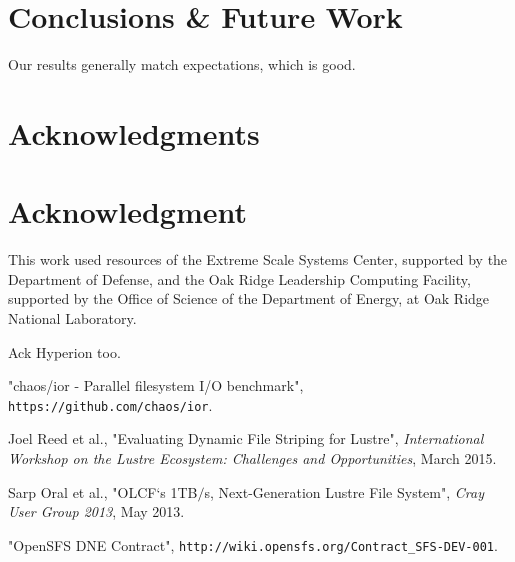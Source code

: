 \documentclass[conference,compsoc]{IEEEtran}
\begin{document}
\section{Conclusions \& Future Work}

Our results generally match expectations, which is good.


\ifCLASSOPTIONcompsoc
  \section*{Acknowledgments}
\else
  \section*{Acknowledgment}
\fi

This work used resources of the Extreme Scale Systems Center, supported
by the Department of Defense, and the Oak Ridge Leadership Computing
Facility, supported by the Office of Science of the Department of
Energy, at Oak Ridge National Laboratory.

Ack Hyperion too.



%
%
%
\begin{thebibliography}{1}


"chaos/ior - Parallel filesystem I/O benchmark", \texttt{https://github.com/chaos/ior}.

Joel Reed et al., "Evaluating Dynamic File Striping for Lustre", \emph{International Workshop on the Lustre Ecosystem: Challenges and Opportunities}, March 2015.

Sarp Oral et al., "OLCF`s 1TB$/$s, Next-Generation Lustre File System", \emph{Cray User Group 2013}, May 2013.

"OpenSFS DNE Contract", \texttt{http://wiki.opensfs.org/Contract\_SFS-DEV-001}.

\end{thebibliography}


\end{document}
